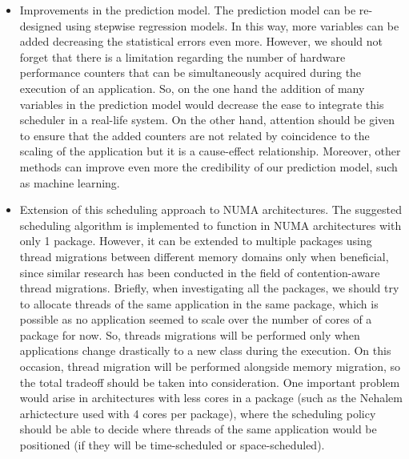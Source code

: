 \documentclass[diploma]{Styles/softlab-thesis}
\begin{document}
\begin{itemize}
    \item Improvements in the prediction model. The prediction model can be re-designed using stepwise regression models. In this way, more variables can be added decreasing the statistical errors even more. However, we should not forget that there is a limitation regarding the number of hardware performance counters that can be simultaneously acquired during the execution of an application. So, on the one hand the addition of many variables in the prediction model would decrease the ease to integrate this scheduler in a real-life system. On the other hand, attention should be given to ensure that the added counters are not related by coincidence to the scaling of the application but it is a cause-effect relationship. Moreover, other methods can improve even more the credibility of our prediction model, such as machine learning.\\
    \item Extension of this scheduling approach to NUMA architectures. The suggested scheduling algorithm is implemented to function in NUMA architectures with only 1 package. However, it can be extended to multiple packages using thread migrations between different memory domains only when beneficial, since similar research has been conducted in the field of contention-aware thread migrations\cite{reference11}. Briefly, when investigating all the packages, we should try to allocate threads of the same application in the same package, which is possible as no application seemed to scale over the number of cores of a package for now.  So, threads migrations will be performed only when applications change drastically to a new class during the execution. On this occasion, thread migration will be performed alongside memory migration, so the total tradeoff should be taken into consideration. One important problem would arise in architectures with less cores in a package (such as the Nehalem arhictecture used with 4 cores per package), where the scheduling policy should be able to decide where threads of the same application would be positioned (if they will be time-scheduled or space-scheduled). \\
\end{itemize}



%

\cleardoublepage
{}
{}
%
\end{document}
